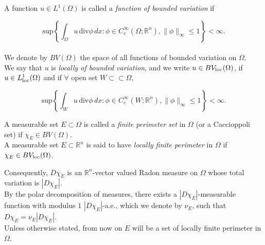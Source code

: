 \begin{definition} A function $u \in L^{1}(\Omega)$ is called a {\em function of bounded variation} if

\[ \mathrm{sup}\left \{ \int_{\Omega} u\, \mathrm{div}\phi\, dx : \phi \in C_{c}^{\infty}(\Omega; \mathbb{R}^{n}), \|\phi\|_{\infty} \le 1 \right \} < \infty. \]
\\
We denote by $BV(\Omega)$ the space of all functions of bounded variation on $\Omega$.
\\
We say that $u$ is {\em locally of bounded variation}, and we write $u \in BV_{\rm loc}(\Omega)$, if $u \in L^{1}_{\rm loc}(\Omega)$ and if $\forall$ open set $W \subset \subset \Omega$,

\[ \mathrm{sup}\left \{ \int_{W} u\, \mathrm{div}\phi\, dx : \phi \in C_{c}^{\infty}(W; \mathbb{R}^{n}), \|\phi\|_{\infty} \le 1 \right \} < \infty. \] 
\end{definition}

\begin{definition} A measurable set $E \subset \Omega$ is called a {\em finite perimeter set} in $\Omega$ (or a Caccioppoli set) if $\chi_{E} \in BV(\Omega)$.
\\
A measurable set $E \subset \mathbb{R}^{n}$ is said to have {\em locally finite perimeter} in $\Omega$ if $\chi_{E} \in BV_{\rm loc}(\Omega)$.
\end{definition}

Consequently, $D\chi_{E}$ is an $\mathbb{R}^{n}$-vector valued Radon measure on $\Omega$ whose total variation is $|D\chi_{E}|$.
\\
By the polar decomposition of measures, there exists a $|D\chi_{E}|$-measurable function with modulus $1$ $|D\chi_{E}|$-a.e., which we denote by $\nu_{E}$, such that $D\chi_{E} = \nu_{E} |D\chi_{E}|$.
\\
Unless otherwise stated, from now on $E$ will be a set of locally finite perimeter in $\Omega$.

